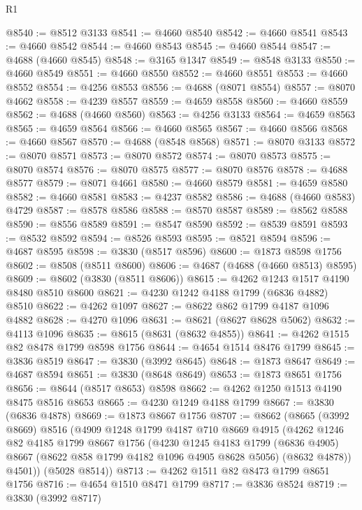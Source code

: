 \begin{lexlean}{R1}
\begin{coremodule}
@8540 := @8512 @3133
@8541 := @4660 @8540
@8542 := @4660 @8541
@8543 := @4660 @8542
@8544 := @4660 @8543
@8545 := @4660 @8544
@8547 := @4688 (@4660 @8545)
@8548 := @3165 @1347
@8549 := @8548 @3133
@8550 := @4660 @8549
@8551 := @4660 @8550
@8552 := @4660 @8551
@8553 := @4660 @8552
@8554 := @4256 @8553
@8556 := @4688 (@8071 @8554)
@8557 := @8070 @4662
@8558 := @4239 @8557
@8559 := @4659 @8558
@8560 := @4660 @8559
@8562 := @4688 (@4660 @8560)
@8563 := @4256 @3133
@8564 := @4659 @8563
@8565 := @4659 @8564
@8566 := @4660 @8565
@8567 := @4660 @8566
@8568 := @4660 @8567
@8570 := @4688 (@8548 @8568)
@8571 := @8070 @3133
@8572 := @8070 @8571
@8573 := @8070 @8572
@8574 := @8070 @8573
@8575 := @8070 @8574
@8576 := @8070 @8575
@8577 := @8070 @8576
@8578 := @4688 @8577
@8579 := @8071 @4661
@8580 := @4660 @8579
@8581 := @4659 @8580
@8582 := @4660 @8581
@8583 := @4237 @8582
@8586 := @4688 (@4660 @8583) @4729
@8587 := @8578 @8586
@8588 := @8570 @8587
@8589 := @8562 @8588
@8590 := @8556 @8589
@8591 := @8547 @8590
@8592 := @8539 @8591
@8593 := @8532 @8592
@8594 := @8526 @8593
@8595 := @8521 @8594
@8596 := @4687 @8595
@8598 := @3830 (@8517 @8596)
@8600 := @1873 @8598 @1756
@8602 := @8508 (@8511 @8600)
@8606 := @4687 (@4688 (@4660 @8513) @8595)
@8609 := @8602 (@3830 (@8511 @8606))
@8615 := @4262 @1243 @1517 @4190 @8480 @8510 @8600
@8621 := @4230 @1242 @4188 @1799 (@6836 @4882) @8510
@8622 := @4262 @1097
@8627 := @8622 @862 @1799 @4187 @1096 @4882
@8628 := @4270 @1096
@8631 := @8621 (@8627 @8628 @5062)
@8632 := @4113 @1096
@8635 := @8615 (@8631 (@8632 @4855))
@8641 := @4262 @1515 @82 @8478 @1799 @8598 @1756
@8644 := @4654 @1514 @8476 @1799
@8645 := @3836 @8519
@8647 := @3830 (@3992 @8645)
@8648 := @1873 @8647
@8649 := @4687 @8594
@8651 := @3830 (@8648 @8649)
@8653 := @1873 @8651 @1756
@8656 := @8644 (@8517 @8653) @8598
@8662 := @4262 @1250 @1513 @4190 @8475 @8516 @8653
@8665 := @4230 @1249 @4188 @1799
@8667 := @3830 (@6836 @4878)
@8669 := @1873 @8667 @1756
@8707 := @8662
    (@8665
      (@3992 @8669)
      @8516
      (@4909
        @1248
        @1799
        @4187
        @710
        @8669
        @4915
        (@4262
          @1246
          @82
          @4185
          @1799
          @8667
          @1756
          (@4230
            @1245
            @4183
            @1799
            (@6836 @4905)
            @8667
            (@8622 @858 @1799 @4182 @1096 @4905 @8628 @5056)
            (@8632 @4878))
          @4501))
      (@5028 @8514))
@8713 := @4262 @1511 @82 @8473 @1799 @8651 @1756
@8716 := @4654 @1510 @8471 @1799
@8717 := @3836 @8524
@8719 := @3830 (@3992 @8717)

\end{coremodule}
\end{lexlean}
